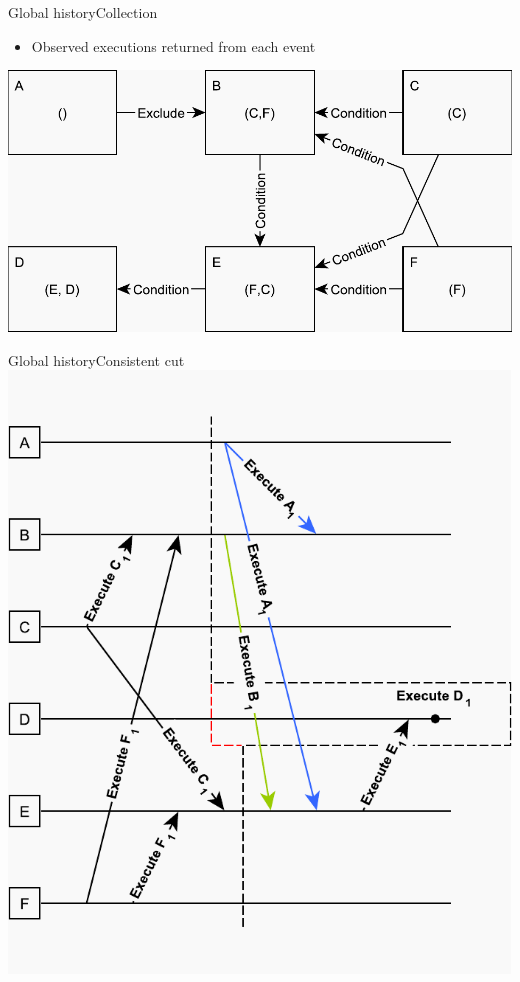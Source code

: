 \documentclass{beamer}
\begin{document}
\begin{frame}{Global history}{Collection}%
    \begin{itemize}
    	\item Observed executions returned from each event
    \end{itemize}
    \vspace{\fill}
    \centering
    \includegraphics[scale=0.5]{figures/inconsistent-cut.pdf}
\end{frame}

\begin{frame}{Global history}{Consistent cut}
	\centering
    \includegraphics[scale=0.6]{figures/consistent-cut.pdf}
\end{frame}
\end{document}
